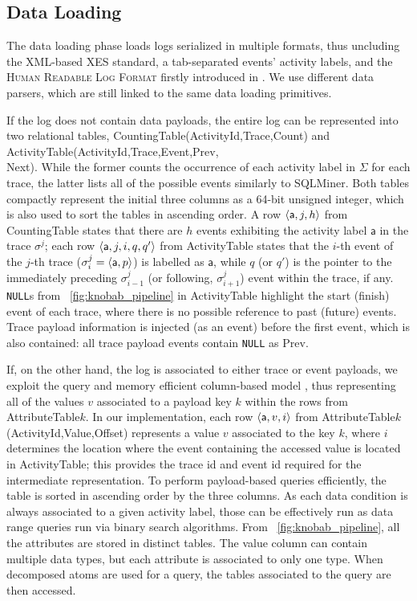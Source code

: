 \subsection{Data Loading}\label{ssec:dl}
The data loading phase   loads logs  serialized in multiple  formats, thus uncluding the XML-based XES standard, a tab-separated events' activity labels, and the \textsc{Human Readable Log Format} firstly introduced in \cite{bpm21}. We use different data parsers, which are still linked to the same data loading primitives. 

If the log does not contain data payloads, the entire log can be represented into two relational tables, \textsf{CountingTable(ActivityId,Trace,Count)} and \textsf{ActivityTable(ActivityId,Trace,Event,Prev,\\Next)}. While the former counts the occurrence of each activity label in $\Sigma$ for each trace, the latter lists all of the possible events similarly to SQLMiner. Both tables compactly represent the initial three columns as a 64-bit unsigned integer, which is also used to sort the tables in ascending order. A row $\braket{\textsf{a},j,h}$ from \textsf{CountingTable} states that there are $h$ events exhibiting the activity label $\textsf{a}$ in the trace $\sigma^j$; each row $\braket{\textsf{a},j,i,q,q'}$ from \textsf{ActivityTable} states that the $i$-th event of the $j$-th trace ($\sigma^j_i=\braket{\textsf{a},p}$) is labelled as $\textsf{a}$, while $q$ (or $q'$) is the pointer to the immediately preceding $\sigma^j_{i-1}$ (or  following, $\sigma^j_{i+1}$) event within the trace, if any. \texttt{NULL}s from  \figurename~\ref{fig:knobab_pipeline} in \textsf{ActivityTable} highlight the start (finish) event of each trace, where there is no possible reference to past (future) events. Trace payload information is injected (as an event) before the first event, which is also contained:  all trace payload events contain \texttt{NULL} as \textsf{Prev}. %


If, on the other hand, the log is associated to either trace or event payloads, we exploit 
the query and memory efficient  column-based model \cite{IdreosGNMMK12}, thus representing all of the values $v$ associated to a  payload key $k$ within the rows from  \textsf{AttributeTable$k$}. In our implementation, each row $\braket{\textsf{a},v,i}$ from  \textsf{AttributeTable$k$(ActivityId,Value,Offset)} represents a value $v$ associated to the key $k$, where $i$ determines the location where the event containing the accessed value is located in \textsf{ActivityTable}; this %
provides the trace id and event id required for the intermediate representation.
 To perform payload-based queries efficiently, the table is sorted in ascending order by the  three columns. As each data condition is always associated to a given activity label, those can be effectively run as data range queries run via binary search algorithms. From \figurename~\ref{fig:knobab_pipeline}, all the attributes are stored in distinct tables. The value column can contain multiple data types, but each attribute is associated to only one type. When decomposed atoms are used for a query, the tables associated to the query are then accessed. %

